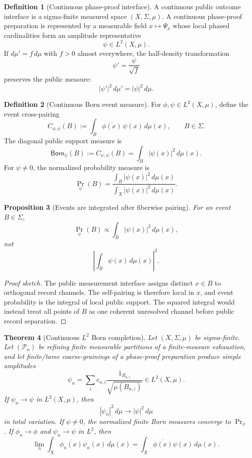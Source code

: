 \documentclass[11pt]{article}
\theoremstyle{plain}
\newtheorem{theorem}{Theorem}[section]
\newtheorem{proposition}[theorem]{Proposition}
\theoremstyle{definition}
\newtheorem{definition}[theorem]{Definition}
\theoremstyle{remark}
\newenvironment{proofsketch}{\begin{proof}[Proof sketch]}{\end{proof}}
\begin{document}
\begin{definition}[Continuous phase-proof interface]
A continuous public outcome interface is a sigma-finite measured space \((X,\Sigma,\mu)\). A continuous phase-proof preparation is represented by a measurable field \(x\mapsto\Psi_x\) whose local phased cardinalities form an amplitude representative
\[
\psi\in L^2(X,\mu).
\]
If \(d\mu'=f\,d\mu\) with \(f>0\) almost everywhere, the half-density transformation
\[
\psi'=\frac{\psi}{\sqrt f}
\]
preserves the public measure:
\[
|\psi'|^2\,d\mu'=|\psi|^2\,d\mu.
\]
\end{definition}

\begin{definition}[Continuous Born event measure]
For \(\phi,\psi\in L^2(X,\mu)\), define the event cross-pairing
\[
C_{\phi,\psi}(B):=\int_B\overline{\phi(x)}\,\psi(x)\,d\mu(x),
\qquad B\in\Sigma.
\]
The diagonal public support measure is
\[
\mathsf{Born}_\psi(B):=C_{\psi,\psi}(B)
=\int_B|\psi(x)|^2\,d\mu(x).
\]
For \(\psi\ne0\), the normalized probability measure is
\[
\Pr_\psi(B)=
\frac{\int_B|\psi(x)|^2\,d\mu(x)}
{\int_X|\psi(x)|^2\,d\mu(x)}.
\]
\end{definition}

\begin{proposition}[Events are integrated after fiberwise pairing]
For an event \(B\in\Sigma\),
\[
\Pr_\psi(B)\propto \int_B|\psi(x)|^2\,d\mu(x),
\]
not
\[
\left|\int_B\psi(x)\,d\mu(x)\right|^2.
\]
\end{proposition}

\begin{proofsketch}
The public measurement interface assigns distinct \(x\in B\) to orthogonal record channels. The self-pairing is therefore local in \(x\), and event probability is the integral of local public support. The squared integral would instead treat all points of \(B\) as one coherent unresolved channel before public record separation.
\end{proofsketch}

\begin{theorem}[Continuous \(L^2\) Born completion]
Let \((X,\Sigma,\mu)\) be sigma-finite. Let \((\mathcal{P}_n)\) be refining finite measurable partitions of a finite-measure exhaustion, and let finite/tame coarse-grainings of a phase-proof preparation produce simple amplitudes
\[
\psi_n=\sum_i c_{n,i}\frac{1_{B_{n,i}}}{\sqrt{\mu(B_{n,i})}}
\in L^2(X,\mu).
\]
If \(\psi_n\to\psi\) in \(L^2(X,\mu)\), then
\[
|\psi_n|^2\,d\mu \to |\psi|^2\,d\mu
\]
in total variation. If \(\psi\ne0\), the normalized finite Born measures converge to \(\Pr_\psi\). If \(\phi_n\to\phi\) and \(\psi_n\to\psi\) in \(L^2\), then
\[
\lim_n\int_X\overline{\phi_n(x)}\psi_n(x)\,d\mu(x)
=
\int_X\overline{\phi(x)}\psi(x)\,d\mu(x).
\]
\end{theorem}
\end{document}
